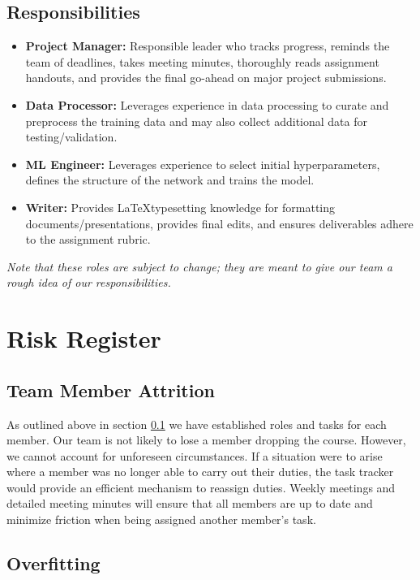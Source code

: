 \documentclass{article} %
\begin{document}
\subsection{Responsibilities} \label{responsibilities}
\begin{itemize}
    \item \textbf{Project Manager:} Responsible leader who tracks progress, reminds the team of deadlines, takes meeting minutes, thoroughly reads assignment handouts, and provides the final go-ahead on major project submissions.
    \item \textbf{Data Processor: } Leverages experience in data processing to curate and preprocess the training data and may also collect additional data for testing/validation. 

\item \textbf{ML Engineer:} Leverages experience to select initial hyperparameters, defines the structure of the network and trains the model.
\item \textbf{Writer: } Provides \LaTeX typesetting knowledge for formatting documents/presentations, provides final edits, and ensures deliverables adhere to the assignment rubric.


\end{itemize}


\textit{Note that these roles are subject to change; they are meant to give our team a rough idea of our responsibilities.}

\section{Risk Register}

\subsection{Team Member Attrition}

As outlined above in section \ref{responsibilities} we have established roles and tasks for each member. Our team is not likely to lose a member dropping the course. However, we cannot account for unforeseen circumstances. If a situation were to arise where a member was no longer able to carry out their duties, the task tracker would provide an efficient mechanism to reassign duties. Weekly meetings and detailed meeting minutes will ensure that all members are up to date and minimize friction when being assigned another member’s task.

\subsection{Overfitting}
\end{document}
